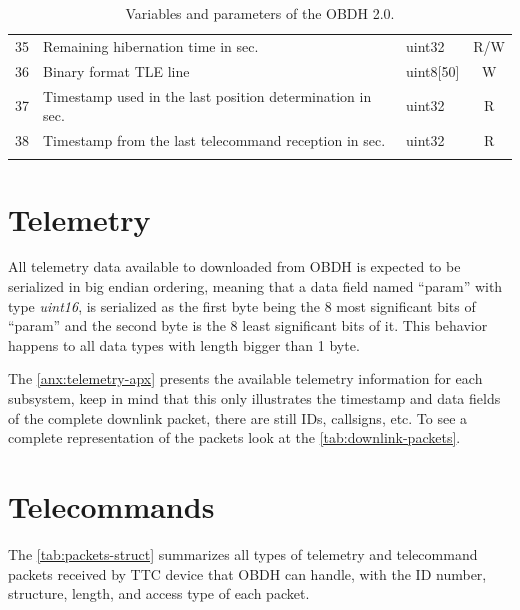 \begin{longtable}[c]{cL{0.70\textwidth}lc}
    35                   & Remaining hibernation time in sec.                                               & uint32                   & R/W                 \\
    36                   & Binary format TLE line                                                           & uint8[50]                & W                   \\
    37                   & Timestamp used in the last position determination in sec.                        & uint32                   & R                   \\
    38                   & Timestamp from the last telecommand reception in sec.                            & uint32                   & R                   \\

	\bottomrule[1.5pt]
	\caption{Variables and parameters of the OBDH 2.0.}
	\label{tab:vars-and-pars}
\end{longtable}

\section{Telemetry}

All telemetry data available to downloaded from OBDH is expected to be serialized in big endian ordering, meaning that a data field named ``param'' with type \textit{uint16}, is serialized as the first byte being the 8 most significant bits of ``param'' and the second byte is the 8 least significant bits of it. This behavior happens to all data types with length bigger than 1 byte.

The \autoref{anx:telemetry-apx} presents the available telemetry information for each subsystem, keep in mind that this only illustrates the timestamp and data fields of the complete downlink packet, there are still IDs, callsigns, etc. To see a complete representation of the packets look at the \autoref{tab:downlink-packets}.

\section{Telecommands} \label{sec:telecommands}

The \autoref{tab:packets-struct} summarizes all types of telemetry and telecommand packets received by TTC device that OBDH can handle, with the ID number, structure, length, and access type of each packet.

